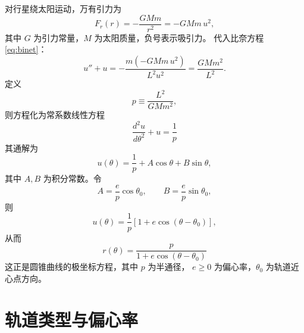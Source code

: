 \documentclass[UTF8,a4paper,11pt]{ctexart}
\begin{document}
对行星绕太阳运动，万有引力为
\begin{equation}
  F_r(r) = -\frac{GMm}{r^{2}}
  = -GMm\,u^{2},
\end{equation}
其中 \(G\) 为引力常量，\(M\) 为太阳质量，负号表示吸引力。
代入比奈方程 \eqref{eq:binet}：
\begin{equation}
  u''+u
  = -\frac{m\left(-GMm\,u^{2}\right)}{L^{2}u^{2}}
  = \frac{GMm^{2}}{L^{2}} .
\end{equation}
定义
\begin{equation}
  p \equiv \frac{L^{2}}{GMm^{2}} ,
  \label{eq:p}
\end{equation}
则方程化为常系数线性方程
\begin{equation}
  \boxed{\
  \frac{d^{2}u}{d\theta^{2}} + u = \frac{1}{p}
  \ } \label{eq:binet-newton}
\end{equation}
其通解为
\begin{equation}
  u(\theta) = \frac{1}{p}
  + A\cos\theta + B\sin\theta ,
\end{equation}
其中 \(A,B\) 为积分常数。令
\begin{equation}
  A = \frac{e}{p}\cos\theta_0,
  \qquad
  B = \frac{e}{p}\sin\theta_0 ,
\end{equation}
则
\begin{equation}
  u(\theta) = \frac{1}{p}\left[1+e\cos(\theta-\theta_0)\right],
\end{equation}
从而
\begin{equation}
  \boxed{\
  r(\theta) = \frac{p}{1+e\cos(\theta-\theta_0)}
  \ } \label{eq:conic}
\end{equation}
这正是圆锥曲线的极坐标方程，其中 \(p\) 为半通径，
\(e\ge 0\) 为偏心率，\(\theta_0\) 为轨道近心点方向。

\section{轨道类型与偏心率}
\end{document}
